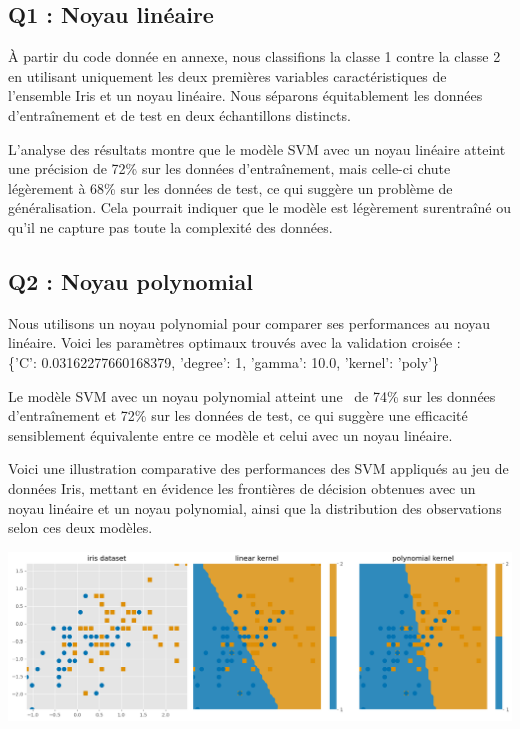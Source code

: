 \documentclass{scrartcl}
\begin{document}
\subsection{Q1 : Noyau linéaire}
\hspace{7pt} À partir du code donnée en annexe, nous classifions la classe 1 contre la classe 2 en utilisant uniquement les deux premières variables caractéristiques de l'ensemble Iris et un noyau linéaire. Nous séparons équitablement les données d'entraînement et de test en deux échantillons distincts.\newline

L'analyse des résultats montre que le modèle SVM avec un noyau linéaire atteint une précision de 72\% sur les données d'entraînement, mais celle-ci chute légèrement à 68\% sur les données de test, ce qui suggère un problème de généralisation. Cela pourrait indiquer que le modèle est légèrement surentraîné ou qu'il ne capture pas toute la complexité des données.

\subsection{Q2 : Noyau polynomial}

\hspace{7pt} Nous utilisons un noyau polynomial pour comparer ses performances au noyau linéaire. Voici les paramètres optimaux trouvés avec la validation croisée :\\
\{'C': 0.03162277660168379, 'degree': 1, 'gamma': 10.0, 'kernel': 'poly'\}\newline

Le modèle SVM avec un noyau polynomial atteint une \ de 74\% sur les données d'entraînement et 72\% sur les données de test, ce qui suggère une efficacité sensiblement équivalente entre ce modèle et celui avec un noyau linéaire.\newline

Voici une illustration comparative des performances des SVM appliqués au jeu de données Iris, mettant en évidence les frontières de décision obtenues avec un noyau linéaire et un noyau polynomial, ainsi que la distribution des observations selon ces deux modèles.\newline

\includegraphics[width=1\textwidth]{../images/iris.png}
\end{document}
